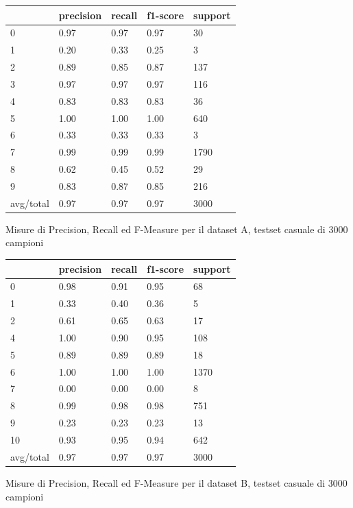\documentclass[10pt,a4paper]{article}
\begin{document}
	
	\begin{table}[!htbp]
    \scriptsize
    \centering
    	\begin{tabularx}{0.56\textwidth}{l | llll}
    		{} & {precision} & {recall} & {f1-score} & {support} \\
    		\midrule
            {0} & {0.97} & {0.97} & {0.97} & {30} \\
            {1} & {0.20} & {0.33} & {0.25} & {3} \\
            {2} & {0.89} & {0.85} & {0.87} & {137} \\
            {3} & {0.97} & {0.97} & {0.97} & {116} \\
            {4} & {0.83} & {0.83} & {0.83} & {36} \\
            {5} & {1.00} & {1.00} & {1.00} & {640} \\
            {6} & {0.33} & {0.33} & {0.33} & {3} \\
            {7} & {0.99} & {0.99} & {0.99} & {1790} \\
            {8} & {0.62} & {0.45} & {0.52} & {29} \\
            {9} & {0.83} & {0.87} & {0.85} & {216} \\
            {avg/total} & {0.97} & {0.97} & {0.97} & {3000} \\
    	\end{tabularx}
    	 {Misure di Precision, Recall ed F-Measure per il dataset A, testset casuale di 3000 campioni}
    	\label{tab:a_3ks}
    \end{table}
    
	\begin{table}[!htbp]
    \scriptsize
    \centering
    	\begin{tabularx}{0.56\textwidth}{l | llll}
    		{} & {precision} & {recall} & {f1-score} & {support} \\
    		\midrule
{0} & {0.98} & {0.91} & {0.95} & {68} \\
{1} & {0.33} & {0.40} & {0.36} & {5} \\
{2} & {0.61} & {0.65} & {0.63} & {17} \\
{4} & {1.00} & {0.90} & {0.95} & {108} \\
{5} & {0.89} & {0.89} & {0.89} & {18} \\
{6} & {1.00} & {1.00} & {1.00} & {1370} \\
{7} & {0.00} & {0.00} & {0.00} & {8} \\
{8} & {0.99} & {0.98} & {0.98} & {751} \\
{9} & {0.23} & {0.23} & {0.23} & {13} \\
{10} & {0.93} & {0.95} & {0.94} & {642} \\
{avg/total} & {0.97} & {0.97} & {0.97} & {3000} \\
    	\end{tabularx}
    	 {Misure di Precision, Recall ed F-Measure per il dataset B, testset casuale di 3000 campioni}
    	\label{tab:b_3ks}
    \end{table}
\end{document}
